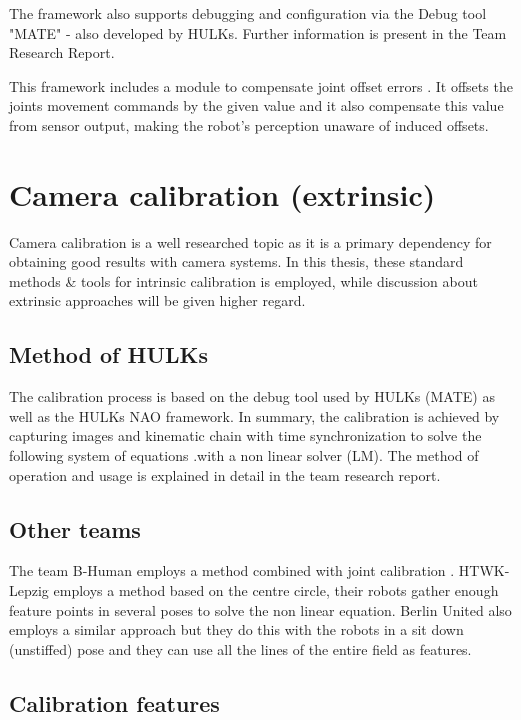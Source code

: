 \documentclass[english, printversion, nomenclature, notitle]{tuvisionthesis} %
\begin{document}
The framework also supports debugging and configuration via the Debug tool "MATE" - also developed by HULKs. Further information is present in the Team Research Report. 

This framework includes a module to compensate joint offset errors . It offsets the joints movement commands by the given value and it also compensate this value from sensor output, making the robot's perception unaware of induced offsets. 

\section{Camera calibration (extrinsic)}
Camera calibration is a well researched topic as it is a primary dependency for obtaining good results with camera systems. In this thesis, these standard methods \& tools for intrinsic calibration is employed, while discussion about extrinsic approaches will be given higher regard.

\subsection{Method of HULKs}

The calibration process is based on the debug tool used by HULKs (MATE) as well as the HULKs NAO framework. In summary, the calibration is achieved by capturing images and kinematic chain with time synchronization to solve the following system of equations .with a non linear solver (LM). The method of operation and usage is explained in detail in the team research report. 

\subsection{Other teams}
The team B-Human employs a method combined with joint calibration . HTWK-Lepzig employs a method based on the centre circle, their robots gather enough feature points in several poses to solve the non linear equation. Berlin United also employs a similar approach but they do this with the robots in a sit down (unstiffed) pose and they can use all the lines of the entire field as features.

\subsection{Calibration features}
\end{document}
